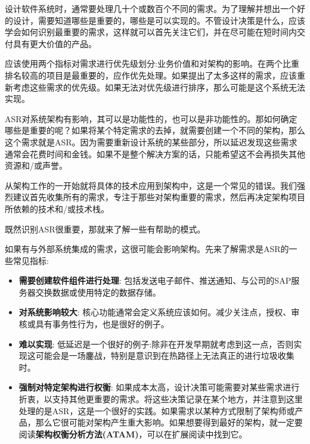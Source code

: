
设计软件系统时，通常要处理几十个或数百个不同的需求。为了理解并想出一个好的设计，需要知道哪些是重要的，哪些是可以实现的。不管设计决策是什么，应该学会如何识别最重要的需求，这样就可以首先关注它们，并在尽可能在短时间内交付具有更大价值的产品。

\begin{tcolorbox}[colback=webgreen!5!white,colframe=webgreen!75!black, title=TIP]
\hspace*{0.75cm}应该使用两个指标对需求进行优先级划分:业务价值和对架构的影响。在两个比重排名较高的项目是最重要的，应作优先处理。如果提出了太多这样的需求，应该重新考虑这些需求的优先级。如果无法对优先级进行排序，那么可能是这个系统无法实现。
\end{tcolorbox}

ASR对系统架构有影响，其可以是功能性的，也可以是非功能性的。那如何确定哪些是重要的呢？如果将某个特定需求的去掉，就需要创建一个不同的架构，那么这个需求就是ASR。因为需要重新设计系统的某些部分，所以延迟发现这些需求通常会花费时间和金钱。如果不是整个解决方案的话，只能希望这不会再损失其他资源和/或声誉。

\begin{tcolorbox}[colback=webgreen!5!white,colframe=webgreen!75!black, title=TIP]
\hspace*{0.75cm}从架构工作的一开始就将具体的技术应用到架构中，这是一个常见的错误。我们强烈建议首先收集所有的需求，专注于那些对架构重要的需求，然后再决定架构项目所依赖的技术和/或技术栈。
\end{tcolorbox}

既然识别ASR很重要，那就来了解一些有帮助的模式。


如果有与外部系统集成的需求，这很可能会影响架构。先来了解需求是ASR的一些常见指标:

\begin{itemize}
\item 
\textbf{需要创建软件组件进行处理}: 包括发送电子邮件、推送通知、与公司的SAP服务器交换数据或使用特定的数据存储。

\item 
\textbf{对系统影响较大}: 核心功能通常会定义系统应该如何。减少关注点，授权、审核或具有事务性行为，也是很好的例子。

\item 
\textbf{难以实现}: 低延迟是一个很好的例子:除非在开发早期就考虑到这一点，否则实现这可能会是一场鏖战，特别是意识到在热路径上无法真正的进行垃圾收集时。

\item 
\textbf{强制对特定架构进行权衡}: 如果成本太高，设计决策可能需要对某些需求进行折衷，以支持其他更重要的需求。将这些决策记录在某个地方，并注意到这里处理的是ASR，这是一个很好的实践。如果需求以某种方式限制了架构师或产品，那么它很可能对架构产生重大影响。如果想要得到最好的架构，就一定要阅读\textbf{架构权衡分析方法(ATAM)}，可以在扩展阅读中找到它。
\end{itemize}

